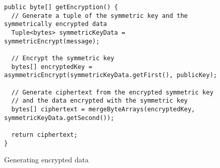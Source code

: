 \begin{figure}[H]
  \centering
  \begin{verbatim}
public byte[] getEncryption() {
  // Generate a tuple of the symmetric key and the symmetrically encrypted data
  Tuple<bytes> symmetricKeyData = symmetricEncrypt(message);

  // Encrypt the symmetric key
  bytes[] encryptedKey = asymmetricEncrypt(symmetricKeyData.getFirst(), publicKey);

  // Generate ciphertext from the encrypted symmetric key
  // and the data encrypted with the symmetric key
  bytes[] ciphertext = mergeByteArrays(encryptedKey, symmetricKeyData.getSecond());

  return ciphertext;
}
  \end{verbatim}
  \caption{Generating encrypted data}
  \label{code:encrypt_data}
\end{figure}
